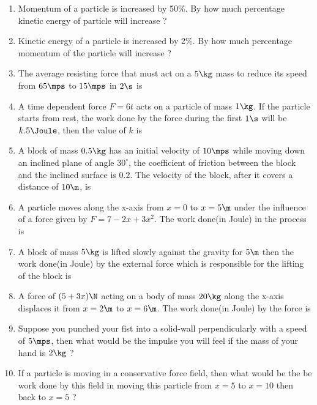 \documentclass{article}
\begin{document}
\begin{enumerate}
\item Momentum of a particle is increased by 50\%. By how much percentage kinetic energy of particle
will increase ?

\item Kinetic energy of a particle is increased by 2\%. By how much percentage momentum of the particle will increase ? 

\item The average resisting force that must act on a $5 \kg$ mass to reduce its speed from $65\mps$ to $15 \mps$ in $2\s$ is 

\item A time dependent force $F = 6t$ acts on a particle of mass $1 \kg$. If the particle starts from rest, the work done by the force during the first $1 \s$ will be $k.5\Joule$, then the value of $k$ is 

\item A block of mass $0.5 \kg$ has an initial velocity of $10 \mps$ while moving down an inclined plane of angle $30^\circ$, the coefficient of friction between the block and the inclined surface is $0.2$. The velocity of the block, after it covers a distance of $10 \m$, is 

\item A particle moves along the x-axis from $x = 0$ to $x = 5 \m$ under the influence of a force given by $F = 7 - 2 x + 3 x^2$. The work done(in Joule) in the process is


\item A block of mass $5\kg$ is lifted slowly against the gravity for $5\m$ then the work done(in Joule) by the external force which is responsible for the lifting of the block is 

\item A force of $(5+3x) \N$ acting on a body of mass $20 \kg$ along the x-axis displaces it from $x=2\m$ to $x=6\m$. The work done(in Joule) by the force is 

\item Suppose you punched your fist into a solid-wall perpendicularly with a speed of $5\mps$, then what would be the impulse you will feel if the mass of your hand is $2\kg$ ?

\item If a particle is moving in a conservative force field, then what would be the be work done by this field in moving this particle from $x=5$ to $x=10$ then back to $x=5$ ?


	
\end{enumerate}
\end{document}
